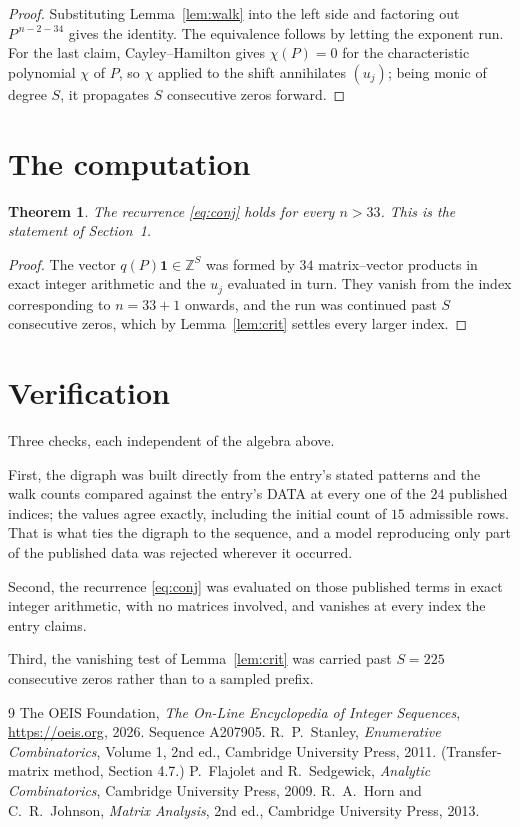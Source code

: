\documentclass[11pt,a4paper]{article}
\theoremstyle{plain}
\newtheorem{theorem}{Theorem}
\theoremstyle{definition}
\begin{document}
\begin{proof}
Substituting Lemma~\ref{lem:walk} into the left side and factoring out
$P^{\,n-2-34}$ gives the identity. The equivalence follows by letting the exponent
run. For the last claim, Cayley--Hamilton gives $\chi(P)=0$ for the characteristic
polynomial $\chi$ of $P$, so $\chi$ applied to the shift annihilates $(u_j)$; being monic of
degree $S$, it propagates $S$ consecutive zeros forward.
\end{proof}

\section{The computation}

\begin{theorem}
The recurrence \eqref{eq:conj} holds for every $n>33$. This is the statement of
Section~1.
\end{theorem}

\begin{proof}
The vector $q(P)\mathbf{1}\in\mathbb{Z}^{S}$ was formed by $34$ matrix--vector
products in exact integer arithmetic and the $u_j$ evaluated in turn. They vanish from the
index corresponding to $n=33+1$ onwards, and the run was continued past $S$ consecutive
zeros, which by Lemma~\ref{lem:crit} settles every larger index.
\end{proof}

\section{Verification}

Three checks, each independent of the algebra above.

First, the digraph was built directly from the entry's stated patterns and the walk counts
compared against the entry's DATA at every one of the $24$ published indices; the
values agree exactly, including the initial count of $15$ admissible rows. That is
what ties the digraph to the sequence, and a model reproducing only part of the published
data was rejected wherever it occurred.

Second, the recurrence \eqref{eq:conj} was evaluated on those published terms in exact
integer arithmetic, with no matrices involved, and vanishes at every index the entry claims.

Third, the vanishing test of Lemma~\ref{lem:crit} was carried past $S=225$ consecutive
zeros rather than to a sampled prefix.

\begin{thebibliography}{9}
 The OEIS Foundation, \emph{The On-Line Encyclopedia of Integer
Sequences}, \url{https://oeis.org}, 2026. Sequence A207905.
 R.~P.~Stanley, \emph{Enumerative Combinatorics}, Volume 1, 2nd ed.,
Cambridge University Press, 2011. (Transfer-matrix method, Section 4.7.)
 P.~Flajolet and R.~Sedgewick, \emph{Analytic Combinatorics}, Cambridge
University Press, 2009.
 R.~A.~Horn and C.~R.~Johnson, \emph{Matrix Analysis}, 2nd ed., Cambridge
University Press, 2013.
\end{thebibliography}
\end{document}
